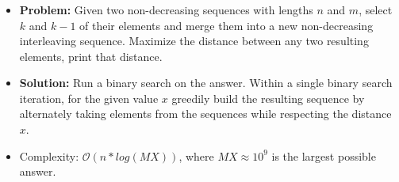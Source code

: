 \begin{frame}
    \frametitle{\problemtitle}
    \begin{itemize}
        \item<+-> \textbf{Problem:} Given two non-decreasing sequences with lengths $n$ and $m$, select $k$ and $k-1$ of their elements and merge them into a new non-decreasing interleaving sequence. Maximize the distance between any two resulting elements, print that distance.
        \item<+-> \textbf{Solution:} Run a binary search on the answer. Within a single binary search iteration, for the given value $x$ greedily build the resulting sequence by alternately taking elements from the sequences while respecting the distance $x$.
        \item<+-> Complexity: $\mathcal O(n*log(MX))$, where $MX \approx 10^9$ is the largest possible answer.
    \end{itemize}
\end{frame}
